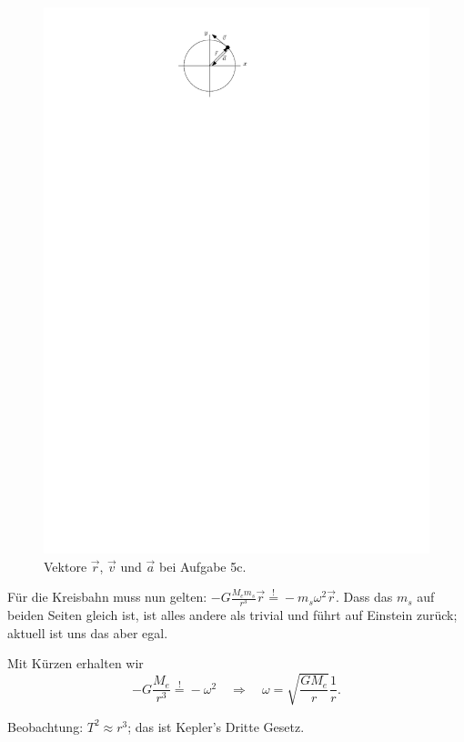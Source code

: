 \begin{description}
	\begin{figure}[h]
		\centering
		\includegraphics{figures/ueb3/aufgabe5c}
		\caption{Vektore $\vec{r}$, $\vec{v}$ und $\vec{a}$ bei Aufgabe 5c.}
		\label{fig:ueb3_aufgabe5c}
	\end{figure}
	
	Für die Kreisbahn muss nun gelten: $-G \frac{M_e m_s}{r^3} \vec{r} \overset{!}{=} -m_s \omega^2 \vec{r}$. Dass das $m_s$ auf beiden Seiten gleich ist, ist alles andere als trivial und führt auf Einstein zurück; aktuell ist uns das aber egal.
	
	Mit Kürzen erhalten wir
	\[
		-G \frac{M_e}{r^3} \overset{!}{=} -\omega^2 \quad \Rightarrow \quad \omega = \sqrt{ \frac{G M_e}{r} } \frac{1}{r}
		\text{.}
	\]
	
	Beobachtung: $T^2 \approx r^3$; das ist Kepler's Dritte Gesetz.
\end{description}

